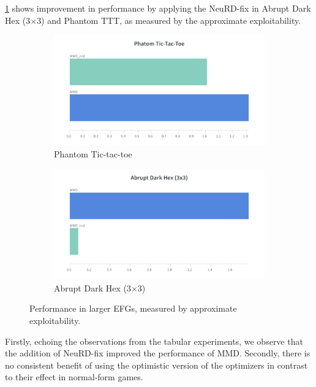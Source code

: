 
\ref{fig:neural2} shows improvement in performance by applying the NeuRD-fix in Abrupt Dark Hex
(3$\times$3) and Phantom TTT, as measured by the approximate exploitability.
\begin{figure}[H]
	\centering
	\begin{subfigure}[b]{0.4\textwidth}
		\includegraphics[width=\textwidth]{figs/pttt.png}
		\caption{Phantom Tic-tac-toe}
	\end{subfigure}
	\begin{subfigure}[b]{0.4\textwidth}
		\includegraphics[width=\textwidth]{figs/ahex33.png}
		\caption{Abrupt Dark Hex (3$\times$3)}
	\end{subfigure}
	\caption{Performance in larger EFGs, measured by approximate exploitability.}
	\label{fig:neural2}
\end{figure}

Firstly, echoing the observations from the tabular experiments, we observe that the addition of
NeuRD-fix improved the performance of MMD.
Secondly, there is no consistent benefit of using the optimistic version of the optimizers in
contrast to their effect in normal-form games.

